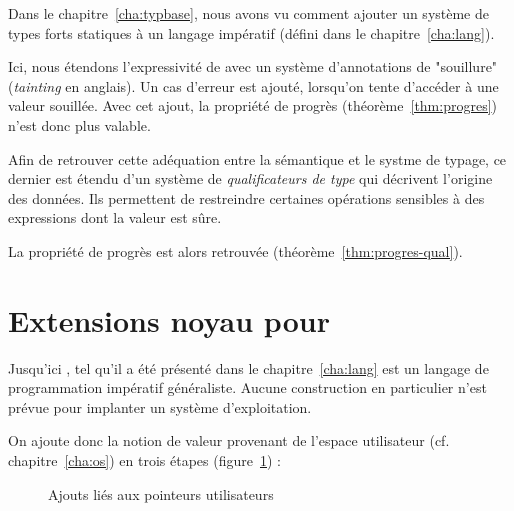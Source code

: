 Dans le chapitre~\ref{cha:typbase}, nous avons vu comment ajouter un système de
types forts statiques à un langage impératif (défini dans le
chapitre~\ref{cha:lang}).

Ici, nous étendons l'expressivité de \langname avec un système d'annotations de
"souillure" (\emph{tainting} en anglais). Un cas d'erreur est ajouté, lorsqu'on
tente d'accéder à une valeur souillée. Avec cet ajout, la propriété de progrès
(théorème~\ref{thm:progres}) n'est donc plus valable.

Afin de retrouver cette adéquation entre la sémantique et le systme de typage,
ce dernier est étendu d'un système de \emph{qualificateurs de type} qui
décrivent l'origine des données. Ils permettent de restreindre certaines
opérations sensibles à des expressions dont la valeur est sûre.

La propriété de progrès est alors retrouvée (théorème~\ref{thm:progres-qual}).

\section{Extensions noyau pour \langname}

Jusqu'ici \langname, tel qu'il a été présenté dans le chapitre~\ref{cha:lang}
est un langage de programmation impératif généraliste. Aucune construction en
particulier n'est prévue pour implanter un système d'exploitation.

On ajoute donc la notion de valeur provenant de l'espace utilisateur (cf.
chapitre~\ref{cha:os}) en trois étapes (figure~\ref{fig:qualif-changes}) :

\begin{figure}%





\caption{Ajouts liés aux pointeurs utilisateurs}
\label{fig:qualif-changes}

\end{figure}%

